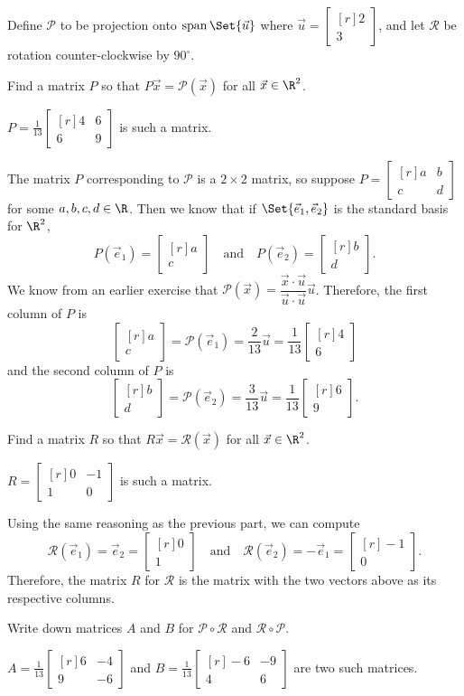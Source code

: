 \documentclass{problemset}
\DeclareMathOperator{\Span}{span}
\newcommand{\xhat}{{\vec e_1}}
\newcommand{\yhat}{{\vec e_2}}
\newcommand{\mat}[1]{\begin{bmatrix*}[r]#1\end{bmatrix*}}
\begin{document}
	\label{projectionAndRotation}
	Define $\mathcal P$ to be projection onto $\Span\Set{\vec u}$ where $\vec u=\mat{2\\3}$,
	and let $\mathcal R$ be rotation counter-clockwise by $90^\circ$.
	\begin{parts}
		\item Find a matrix $P$ so that $P\vec x=\mathcal P(\vec x)$ for all $\vec x\in\R^2$.
			\begin{solution}
				$P = \frac{1}{13}\mat{4&6\\6&9}$ is such a matrix.

				The matrix $P$ corresponding to $\mathcal P$ is a $2\times 2$ matrix,
				so suppose $P=\mat{a&b\\c&d}$ for some $a,b,c,d\in\R$. Then we
				know that if $\Set{\xhat,\yhat}$ is the standard basis for $\R^2$,
				\[
					P(\xhat)=\mat{a\\c} \quad \text{and} \quad P(\yhat)=\mat{b\\d}.
				\]
				We know from an earlier exercise that
				$\mathcal P(\vec x)=\dfrac{\vec x\cdot\vec u}{\vec u\cdot\vec u}\vec u$.
				Therefore, the first column of $P$ is
				\[
					\mat{a\\c}=\mathcal P(\xhat)=\frac{2}{13}\vec u=\frac{1}{13}\mat{4\\6}
				\]
				and the second column of $P$ is
				\[
					\mat{b\\d}=\mathcal P(\yhat)=\frac{3}{13}\vec u=\frac{1}{13}\mat{6\\9}.
				\]
			\end{solution}
		\item Find a matrix $R$ so that $R\vec x=\mathcal R(\vec x)$ for all $\vec x\in\R^2$.
			\begin{solution}
				$R=\mat{0&-1\\1&0}$ is such a matrix.

				Using the same reasoning as the previous part, we can compute
				\[
					\mathcal R(\xhat)=\yhat=\mat{0\\1}
					\quad \text{and} \quad
					\mathcal R(\yhat)=-\xhat=\mat{-1\\0}.
				\]
				Therefore, the matrix $R$ for $\mathcal R$ is the matrix with the
				two vectors above as its respective columns.
			\end{solution}
		\item Write down matrices $A$ and $B$ for $\mathcal P\circ\mathcal R$
			and $\mathcal R\circ \mathcal P$.
			\begin{solution}
				$A=\frac{1}{13}\mat{6&-4\\9&-6}$ and $B=\frac{1}{13}\mat{-6&-9\\4&6}$
				are two such matrices.


\end{solution}
\end{parts}
\end{document}

